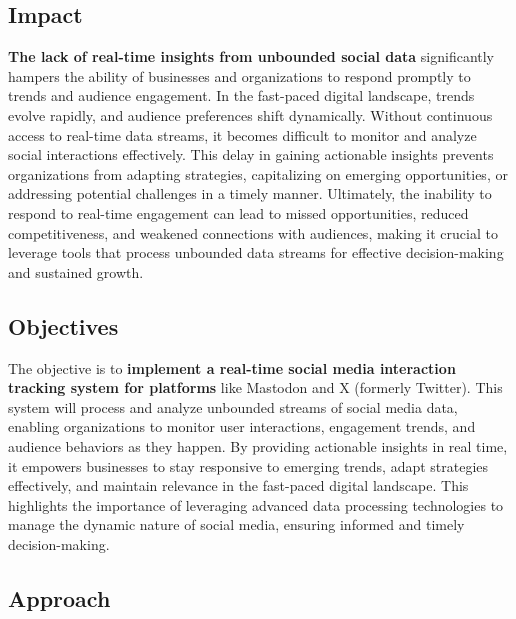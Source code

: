\documentclass[12pt, a4paper]{article}
\begin{document}
    \subsection{Impact}
    \textbf{The lack of real-time insights from unbounded social data}
    significantly hampers the ability of businesses and organizations to respond
    promptly to trends and audience engagement. In the fast-paced digital
    landscape, trends evolve rapidly, and audience preferences shift
    dynamically. Without continuous access to real-time data streams, it becomes
    difficult to monitor and analyze social interactions effectively. This delay
    in gaining actionable insights prevents organizations from adapting
    strategies, capitalizing on emerging opportunities, or addressing potential
    challenges in a timely manner. Ultimately, the inability to respond to
    real-time engagement can lead to missed opportunities, reduced
    competitiveness, and weakened connections with audiences, making it crucial
    to leverage tools that process unbounded data streams for effective
    decision-making and sustained growth.
    \subsection{Objectives}
    The objective is to \textbf{implement a real-time social media interaction
    tracking system for platforms} like Mastodon and X (formerly Twitter). This
    system will process and analyze unbounded streams of social media data,
    enabling organizations to monitor user interactions, engagement trends, and
    audience behaviors as they happen. By providing actionable insights in real
    time, it empowers businesses to stay responsive to emerging trends, adapt
    strategies effectively, and maintain relevance in the fast-paced digital
    landscape. This highlights the importance of leveraging advanced data
    processing technologies to manage the dynamic nature of social media,
    ensuring informed and timely decision-making.

    \subsection{Approach}
\end{document}
